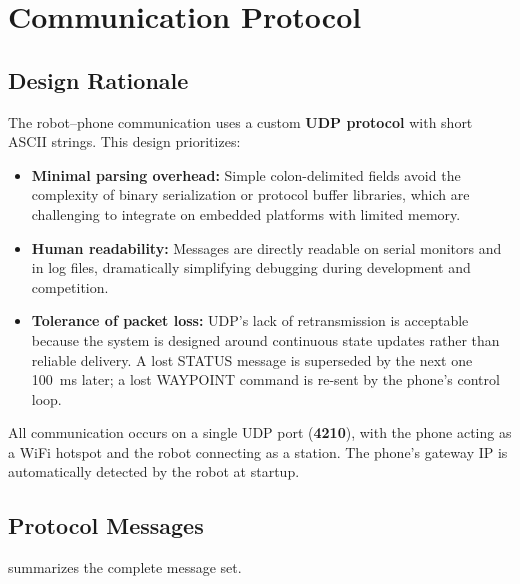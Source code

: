 \documentclass[12pt, a4paper, twoside]{article}
\begin{document}
\section{Communication Protocol}
\label{sec:protocol}

\subsection{Design Rationale}

The robot--phone communication uses a custom \textbf{UDP protocol} with short ASCII strings. This design prioritizes:

\begin{itemize}
    \item \textbf{Minimal parsing overhead:} Simple colon-delimited fields avoid the complexity of binary serialization or protocol buffer libraries, which are challenging to integrate on embedded platforms with limited memory.
    \item \textbf{Human readability:} Messages are directly readable on serial monitors and in log files, dramatically simplifying debugging during development and competition.
    \item \textbf{Tolerance of packet loss:} UDP's lack of retransmission is acceptable because the system is designed around continuous state updates rather than reliable delivery. A lost STATUS message is superseded by the next one \SI{100}{\milli\second} later; a lost WAYPOINT command is re-sent by the phone's control loop.
\end{itemize}

All communication occurs on a single UDP port (\textbf{4210}), with the phone acting as a WiFi hotspot and the robot connecting as a station. The phone's gateway IP is automatically detected by the robot at startup.

\subsection{Protocol Messages}

 summarizes the complete message set.
\end{document}
